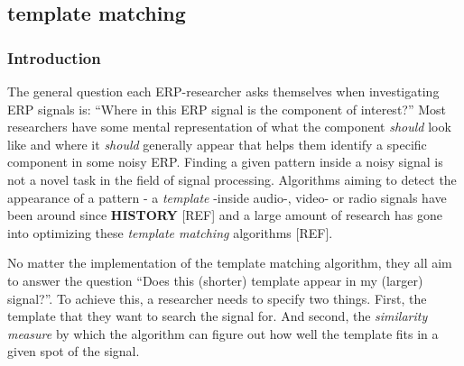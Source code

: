 \documentclass[
  man,floatsintext]{apa7}
\begin{document}
\hypertarget{template-matching}{%
\subsection{template matching}\label{template-matching}}

\hypertarget{introduction}{%
\subsubsection{Introduction}\label{introduction}}

The general question each ERP-researcher asks themselves when investigating ERP signals is: ``Where in this ERP signal is the component of interest?'' Most researchers have some mental representation of what the component \emph{should} look like and where it \emph{should} generally appear that helps them identify a specific component in some noisy ERP.
Finding a given pattern inside a noisy signal is not a novel task in the field of signal processing. Algorithms aiming to detect the appearance of a pattern - a \emph{template} -inside audio-, video- or radio signals have been around since \textbf{HISTORY} {[}REF{]} and a large amount of research has gone into optimizing these \emph{template matching} algorithms {[}REF{]}.

No matter the implementation of the template matching algorithm, they all aim to answer the question ``Does this (shorter) template appear in my (larger) signal?''. To achieve this, a researcher needs to specify two things. First, the template that they want to search the signal for. And second, the \emph{similarity measure} by which the algorithm can figure out how well the template fits in a given spot of the signal.
\end{document}
